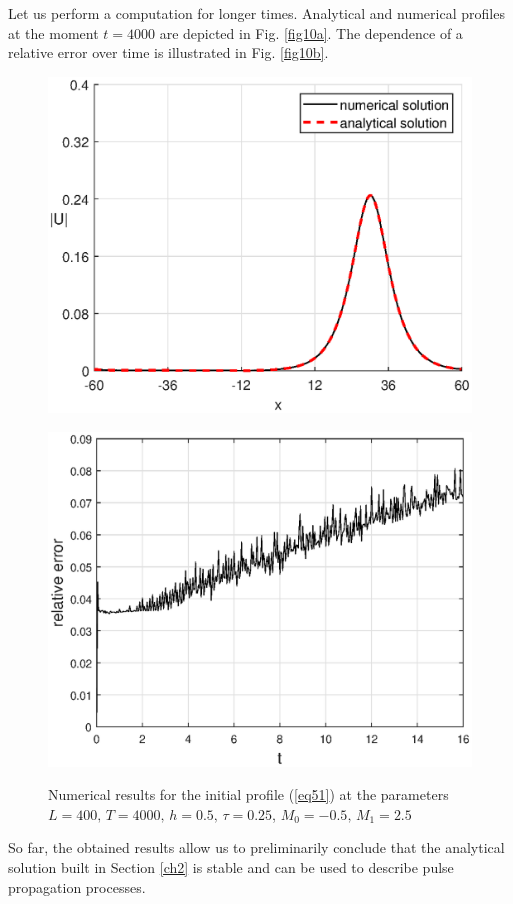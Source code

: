 \documentclass[preprint,12pt]{elsarticle}
\begin{document}
Let us perform a computation for longer times. Analytical and numerical profiles at the moment \(t=4000\) are depicted in Fig. \ref{fig10a}. The dependence of a relative error over time is illustrated in Fig. \ref{fig10b}.
\begin{figure}[H]
\begin{center}
\begin{minipage}[h]{0.48\linewidth} %
\includegraphics[width=1\linewidth]{fig12.eps}
\label{fig10a}
\end{minipage}
\hfill
\begin{minipage}[h]{0.48\linewidth}
\includegraphics[width=1\linewidth]{fig13.eps}
\label{fig10b}
\end{minipage}
\end{center}
\caption{Numerical results for the initial profile (\ref{eq51}) at the parameters
\(L=400,\, T=4000,\, h=0.5,\, \tau=0.25\), 
\(M_{0}=-0.5,\, M_{1}=2.5\)}
\label{fig10}
\end{figure}
So far, the obtained results allow us to preliminarily conclude that the analytical solution built in Section \ref{ch2} is stable and can be used to describe pulse propagation processes.
\end{document}
